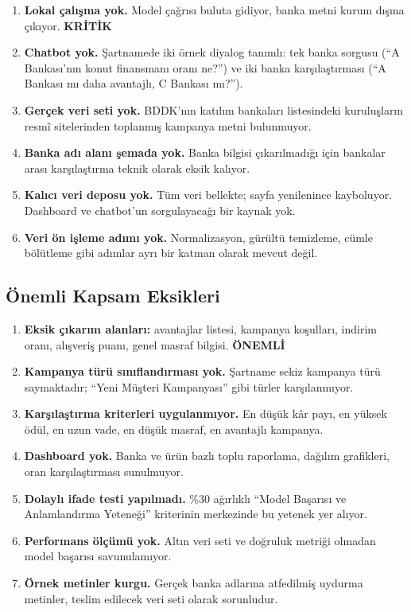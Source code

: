 \documentclass[11pt,a4paper]{article}
\newcommand{\kritikrozet}{\textcolor{kritik}{\textbf{KRİTİK}}}
\newcommand{\onemlirozet}{\textcolor{onemli}{\textbf{ÖNEMLİ}}}
\begin{document}
\begin{enumerate}[label=\textbf{K\arabic*.},leftmargin=1.4cm,itemsep=4pt]
  \item \textbf{Lokal çalışma yok.} Model çağrısı buluta gidiyor, banka metni kurum
        dışına çıkıyor. \hfill \kritikrozet
  \item \textbf{Chatbot yok.} Şartnamede iki örnek diyalog tanımlı: tek banka sorgusu
        (``A Bankası'nın konut finansmanı oranı ne?'') ve iki banka karşılaştırması
        (``A Bankası mı daha avantajlı, C Bankası mı?'').
  \item \textbf{Gerçek veri seti yok.} BDDK'nın katılım bankaları listesindeki
        kuruluşların resmî sitelerinden toplanmış kampanya metni bulunmuyor.
  \item \textbf{Banka adı alanı şemada yok.} Banka bilgisi çıkarılmadığı için
        bankalar arası karşılaştırma teknik olarak eksik kalıyor.
  \item \textbf{Kalıcı veri deposu yok.} Tüm veri bellekte; sayfa yenilenince
        kayboluyor. Dashboard ve chatbot'un sorgulayacağı bir kaynak yok.
  \item \textbf{Veri ön işleme adımı yok.} Normalizasyon, gürültü temizleme,
        cümle bölütleme gibi adımlar ayrı bir katman olarak mevcut değil.
\end{enumerate}

\subsection{Önemli Kapsam Eksikleri}

\begin{enumerate}[label=\textbf{Ö\arabic*.},leftmargin=1.4cm,itemsep=4pt]
  \item \textbf{Eksik çıkarım alanları:} avantajlar listesi, kampanya koşulları,
        indirim oranı, alışveriş puanı, genel masraf bilgisi. \hfill \onemlirozet
  \item \textbf{Kampanya türü sınıflandırması yok.} Şartname sekiz kampanya türü
        saymaktadır; ``Yeni Müşteri Kampanyası'' gibi türler karşılanmıyor.
  \item \textbf{Karşılaştırma kriterleri uygulanmıyor.} En düşük kâr payı, en yüksek
        ödül, en uzun vade, en düşük masraf, en avantajlı kampanya.
  \item \textbf{Dashboard yok.} Banka ve ürün bazlı toplu raporlama, dağılım
        grafikleri, oran karşılaştırması sunulmuyor.
  \item \textbf{Dolaylı ifade testi yapılmadı.} \%30 ağırlıklı ``Model Başarısı ve
        Anlamlandırma Yeteneği'' kriterinin merkezinde bu yetenek yer alıyor.
  \item \textbf{Performans ölçümü yok.} Altın veri seti ve doğruluk metriği olmadan
        model başarısı savunulamıyor.
  \item \textbf{Örnek metinler kurgu.} Gerçek banka adlarına atfedilmiş uydurma
        metinler, teslim edilecek veri seti olarak sorunludur.
\end{enumerate}
\end{document}
